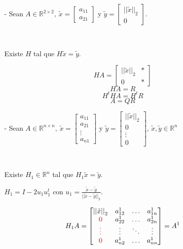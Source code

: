 \begin{itemize}
    \item[-] Sean $A \in \mathbb{R}^{2 \times 2},~\tilde{x}=\begin{bmatrix}
        a_{11} \\ a_{21}
    \end{bmatrix}$ y $\tilde{y} = \begin{bmatrix}
        {||\tilde{x}||}_{2} \\ 0
    \end{bmatrix}$.
    
    \
    
    \noindent Existe $H$ tal que $H\tilde{x} = \tilde{y}$.
    
    \[HA = \begin{bmatrix}
        {||\tilde{x}||}_{2} & * \\
        0 & *
    \end{bmatrix}\]
    \[HA = R\]
    \[H^{t}HA = H^{t}R\]
    \[A = QR\]

    \item[-] Sean $A \in \mathbb{R}^{n \times n},~\tilde{x}=\begin{bmatrix}
        a_{11} \\ a_{21} \\ \vdots \\ a_{n1}
    \end{bmatrix}$ y $\tilde{y} = \begin{bmatrix}
        {||\tilde{x}||}_{2} \\ 0 \\ \vdots \\ 0
    \end{bmatrix}$,  $\tilde{x}, \tilde{y} \in \mathbb{R}^{n}$
    
    \
    
    \noindent Existe $H_1 \in \mathbb{R}^{n}$ tal que $H_1\tilde{x} = \tilde{y}$.
    
    \noindent $H_1 = I - 2u_{1}u_{1}^{t}$ con $u_1 = \frac{\tilde{x} - \tilde{y}}{{||\tilde{x} - \tilde{y}||}_{2}}$.
    
    \[H_{1}A = \begin{bmatrix}
        {||\tilde{x}||}_{2} & a_{12}^{1} & \ldots & a_{1n}^{1} \\
        \textcolor{red}{0} & a_{22}^{1} & \ldots & a_{2n}^{1} \\
        \textcolor{red}{\vdots} & \vdots & \ddots & \vdots \\
        \textcolor{red}{0} & a_{n2}^{1} & \ldots & a_{nn}^{1} \\
    \end{bmatrix} = A^{1}\]
        

\end{itemize}
